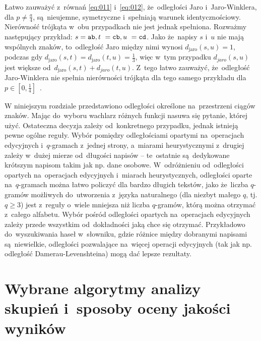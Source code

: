 \documentclass{praca1}
\begin{document}
Łatwo zauważyć z~równań \eqref{eq:011} i~\eqref{eq:012}, że~odległości Jaro i~Jaro-Winklera, dla $p \neq \frac{a}{4}$, są~nieujemne,  symetryczne i~spełniają warunek identycznościowy. Nierówność trójkąta w~obu przypadkach nie jest jednak spełniona. Rozważmy następujący przykład: $s = \verb|ab|, t~= \verb|cb|, u~= \verb|cd|$. Jako że~napisy $s$ i~$u$ nie mają wspólnych znaków, to~odległość Jaro między nimi wynosi $d_{\mathrm{jaro}}(s, u) = 1$, podczas gdy $d_{\mathrm{jaro}}(s, t) = d_{\mathrm{jaro}}(t, u) = \frac{1}{3}$, więc w~tym przypadku $d_{jaro}(s, u)$ jest większe od~$d_{\mathrm{jaro}}(s, t) + d_{jaro}(t, u)$. Z~tego łatwo zauważyć, że~odległość Jaro-Winklera nie spełnia nierówności trójkąta  dla tego samego przykładu dla $p \in [0, \frac{1}{4}]$~\cite{Loo2014:stringdist}.


W niniejszym rozdziale przedstawiono odległości określone na~przestrzeni ciągów znaków. Mając do~wyboru wachlarz różnych funkcji nasuwa się pytanie, której użyć. Ostateczna decyzja zależy od~konkretnego przypadku, jednak istnieją pewne ogólne reguły. Wybór pomiędzy odległościami opartymi na~operacjach edycyjnych i~$q$-gramach z~jednej strony, a~miarami heurystycznymi z~drugiej zależy w~dużej mierze od~długości napisów -- te~ostatnie są~dedykowane krótszym napisom takim jak np. dane osobowe. W~odróżnieniu od~odległości opartych na~operacjach edycyjnych i~miarach heurystycznych, odległości oparte na~$q$-gramach można łatwo policzyć dla bardzo długich tekstów, jako że~liczba $q$-gramów możliwych do~utworzenia z~języka naturalnego (dla niezbyt małego $q$, tj. $q \geq 3$) jest z~reguły o~wiele mniejsza niż liczba $q$-gramów, którą można otrzymać z~całego alfabetu. Wybór pośród odległości opartych na~operacjach edycyjnych zależy przede wszystkim od~dokładności jaką chce się otrzymać. Przykładowo do~wyszukiwania haseł w~słowniku, gdzie różnice między dobranymi napisami są~niewielkie, odległości pozwalające na~więcej operacji edycyjnych (tak jak np. odległość Damerau-Levenshteina) mogą dać lepsze rezultaty. %


\chapter{Wybrane algorytmy analizy skupień i~sposoby oceny jakości wyników}
\label{analiza-skupien}
\end{document}
